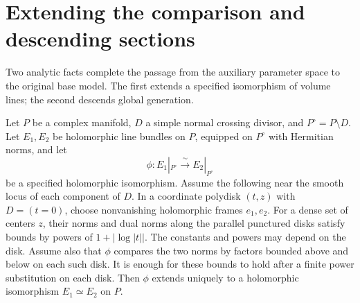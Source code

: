 \section{Extending the comparison and descending sections}
\label{descent:section}

Two analytic facts complete the passage from the auxiliary parameter
space to the original base model.  The first extends a specified
isomorphism of volume lines; the second descends global generation.

\begin{lemma}
\label{descent:unit}
Let \(P\) be a complex manifold, \(D\) a simple normal crossing
divisor, and \(P^\circ=P\setminus D\).
Let \(E_1,E_2\) be holomorphic line bundles on \(P\), equipped on
\(P^\circ\) with Hermitian norms, and let
\[
 \phi:E_1|_{P^\circ}\xrightarrow{\ \sim\ }E_2|_{P^\circ}
\]
be a specified holomorphic isomorphism.
Assume the following near the smooth locus of each component of
\(D\).
In a coordinate polydisk \((t,z)\) with \(D=(t=0)\), choose
nonvanishing holomorphic frames \(e_1,e_2\).
For a dense set of centers \(z\), their norms and dual norms along
the parallel punctured disks satisfy bounds by powers of
\(1+|\log|t||\).  The constants and powers may depend on the disk.
Assume also that \(\phi\) compares the two norms by factors bounded
above and below on each such disk.
It is enough for these bounds to hold after a finite power
substitution on each disk.
Then \(\phi\) extends uniquely to a holomorphic isomorphism
\(E_1\simeq E_2\) on \(P\).
\end{lemma}

